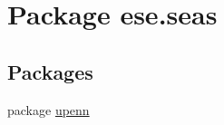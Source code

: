 \hypertarget{namespaceese_1_1seas}{}\section{Package ese.\+seas}
\label{namespaceese_1_1seas}
\subsection*{Packages}
\begin{DoxyCompactItemize}
\item 
package \hyperlink{namespaceese_1_1seas_1_1upenn}{upenn}
\end{DoxyCompactItemize}
